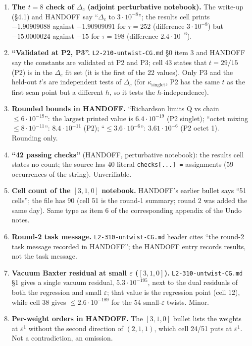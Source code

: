 \documentclass[10pt]{article}
\newcommand{\nb}[1]{\texttt{#1}}
\begin{document}
\begin{enumerate}
\item \textbf{The $t=8$ check of $\Delta_c$ (adjoint perturbative notebook).} The write-up (\S{}4.1) and HANDOFF say ``$\Delta_c$ to $3\cdot10^{-8}$''; the results cell prints $-1.90909088$ against $-1.90909091$ for $\tau=252$ (difference $3\cdot10^{-8}$) but $-15.0000024$ against $-15$ for $\tau=198$ (difference $2.4\cdot10^{-6}$).
\item \textbf{``Validated at P2, P3''.} \nb{L2-\allowbreak{}210-\allowbreak{}untwist-\allowbreak{}CG.\allowbreak{}md} \S{}0 item 3 and HANDOFF say the constants are validated at P2 and P3; cell 43 states that $t=29/15$ (P2) is in the $\Delta_c$ fit set (it is the first of the 22 values). Only P3 and the held-out $t$'s are independent tests of $\Delta_c$ (for $\kappa_{\mathrm{singlet}}$, P2 has the same $t$ as the first scan point but a different $h$, so it tests the $h$-independence).
\item \textbf{Rounded bounds in HANDOFF.} ``Richardson limits Q vs chain $\le6\cdot10^{-19}$'': the largest printed value is $6.4\cdot10^{-19}$ (P2 singlet); ``octet mixing $\le8\cdot10^{-11}$'': $8.4\cdot10^{-11}$ (P2); ``$\le3.6\cdot10^{-6}$'': $3.61\cdot10^{-6}$ (P2 octet 1). Rounding only.
\item \textbf{``42 passing checks''} (HANDOFF, perturbative notebook): the results cell states no count; the source has 40 literal \nb{checks[.\allowbreak{}.\allowbreak{}.\allowbreak{}] =} assignments (59 occurrences of the string). Unverifiable.
\item \textbf{Cell count of the $[3,1,0]$ notebook.} HANDOFF's earlier bullet says ``51 cells''; the file has 90 (cell 51 is the round-1 summary; round 2 was added the same day). Same type as item 6 of the corresponding appendix of the Undo notes.
\item \textbf{Round-2 task message.} \nb{L2-\allowbreak{}310-\allowbreak{}untwist-\allowbreak{}CG.\allowbreak{}md} header cites ``the round-2 task message recorded in HANDOFF''; the HANDOFF entry records results, not the task message.
\item \textbf{Vacuum Baxter residual at small $\varepsilon$ ($[3,1,0]$).} \nb{L2-\allowbreak{}310-\allowbreak{}untwist-\allowbreak{}CG.\allowbreak{}md} \S{}1 gives a single vacuum residual, $5.3\cdot10^{-195}$, next to the dual residuals of both the regression and small $\varepsilon$; that value is the regression point (cell 12), while cell 38 gives $\le2.6\cdot10^{-189}$ for the 54 small-$\varepsilon$ twists. Minor.
\item \textbf{Per-weight orders in HANDOFF.} The $[3,1,0]$ bullet lists the weights at $\varepsilon^1$ without the second direction of $(2,1,1)$, which cell 24/51 puts at $\varepsilon^1$. Not a contradiction, an omission.

\end{enumerate}
\end{document}
